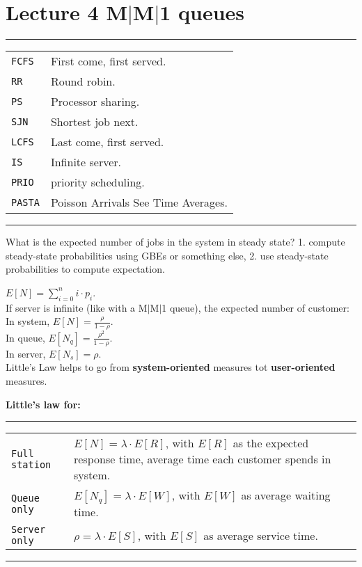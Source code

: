\section{Lecture 4 M$|$M$|$1 queues}
\hrule
{}
\begin{tabular}{@{}p{\the\MyLen}@{}p{\linewidth-\the\MyLen}@{}}
\verb!FCFS!				&	First come, first served.\\
\verb!RR!				&	Round robin.\\
\verb!PS!				&	Processor sharing.\\
\verb!SJN!				&	Shortest job next.\\
\verb!LCFS!				&	Last come, first served.\\
\verb!IS!				&	Infinite server.\\
\verb!PRIO!				&	priority scheduling.\\
\verb!PASTA!			&	Poisson Arrivals See Time Averages.\\
\end{tabular}
\hrule

What is the expected number of jobs in the system in steady
state? 1. compute steady-state probabilities using GBEs or something else, 2. use steady-state probabilities to compute expectation. 

$E[N] = \sum^{n}_{i=0} i \cdot p_{i}$.\\
If server is infinite (like with a M$|$M$|$1 queue), the expected number of customer:\\
In system, $E[N] = \frac{\rho}{1-\rho}$.\\
In queue, $E[N_{q}] = \frac{\rho^2}{1-\rho}$.\\
In server, $E[N_{s}] = \rho$.\\

Little's Law helps to go from \textbf{system-oriented} measures tot \textbf{user-oriented} measures. 

\textbf{Little's law for:}
\hrule
{}
\begin{tabular}{@{}p{\the\MyLen}@{}p{\linewidth-\the\MyLen}@{}}
\verb!Full station!				&	$E[N] = \lambda \cdot E[R]$, with $E[R]$ as the expected response time, average time each customer spends in system.\\
\verb!Queue only!				&	$E[N_{q}] = \lambda \cdot E[W]$, with $E[W]$ as average waiting time.\\
\verb!Server only!				&	$\rho = \lambda \cdot E[S]$, with $E[S]$ as  average service time.\\
\end{tabular}
\hrule

